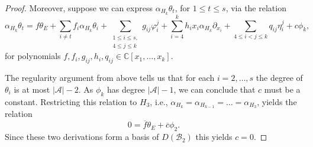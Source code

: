 \documentclass[a4paper,11pt]{amsart}
\def\A{{\mathcal{A}}}%
\def\B{{\mathcal{B}}}%
\numberwithin{equation}{section}
\theoremstyle{remark}
\begin{document}
\begin{proof}
Moreover, suppose we can express $\alpha_{H_k}\theta_t$, for $1\le t \le s$, via the relation
\begin{equation}\label{eq:relation}
	\alpha_{H_k}\theta_t=f \theta_E+\sum_{i\neq t} f_i \alpha_{H_k} \theta_i+
	\sum_{\substack{1\le i \le s, \\4\le j \le k}}g_{ij} \varphi_i^j+\sum_{i=4}^k h_{i} x_i\alpha_{H_k} \partial_{x_i}+
	\sum_{4\le i < j \le k} q_{ij}\eta_i^j+
	c \phi_k,
\end{equation}
for polynomials $f, f_i, g_{ij},h_i,q_{ij}\in \mathbb{C}[x_1,\ldots,x_k]$.

The regularity argument from above tells us that for each $i=2,\ldots,s$ the degree of $\theta_i$ is at most $|\A|-2$.
As $\phi_k$ has degree $|\A|-1$, we can conclude that $c$ must be a constant.
Restricting this relation to $H_3$, i.e., $\alpha_{H_k}=\alpha_{H_{k-1}}=\dots = \alpha_{H_{3}}$, yields the relation
\[
0 = \overline{f} \theta_E + \overline{c} \phi_2.
\]
Since these two derivations form a basis of $D(\B_2)$ this yields $c=0$.



\end{proof}
\end{document}
